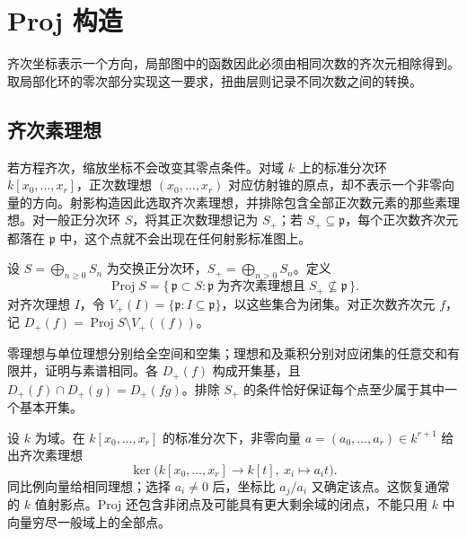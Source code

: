 
\section{Proj 构造}
\label{b3:sec:2403}

齐次坐标表示一个方向，局部图中的函数因此必须由相同次数的齐次元相除得到。取局部化环的零次部分实现这一要求，扭曲层则记录不同次数之间的转换。


%
%
%

\subsection{齐次素理想}
\label{b3:subsec:2403:01}

若方程齐次，缩放坐标不会改变其零点条件。对域 \(k\) 上的标准分次环 \(k[x_0,\ldots,x_r]\)，正次数理想 \((x_0,\ldots,x_r)\) 对应仿射锥的原点，却不表示一个非零向量的方向。射影构造因此选取齐次素理想，并排除包含全部正次数元素的那些素理想。对一般正分次环 \(S\)，将其正次数理想记为 \(S_+\)；若 \(S_+\subseteq\mathfrak p\)，每个正次数齐次元都落在 \(\mathfrak p\) 中，这个点就不会出现在任何射影标准图上。

\begin{definition}\label{b3:def:proj}
	设 \(S=\bigoplus_{n\ge0}S_n\) 为交换正分次环，\(S_+=\bigoplus_{n>0}S_n\)。定义
	\[
		\operatorname{Proj}S =\{\,\mathfrak p\subset S:\mathfrak p\;\text{为齐次素理想且}\; S_+\not\subseteq\mathfrak p\,\}.
	\]
	对齐次理想 \(I\)，令 \(V_+(I)=\{\mathfrak p:I\subseteq\mathfrak p\}\)，以这些集合为闭集。对正次数齐次元 \(f\)，记 \(D_+(f)=\operatorname{Proj}S\setminus V_+((f))\)。
\end{definition}

零理想与单位理想分别给全空间和空集；理想和及乘积分别对应闭集的任意交和有限并，证明与素谱相同。各 \(D_+(f)\) 构成开集基，且 \(D_+(f)\cap D_+(g)=D_+(fg)\)。排除 \(S_+\) 的条件恰好保证每个点至少属于其中一个基本开集。

\ProseParagraphBreak
设 \(k\) 为域。在 \(k[x_0,\ldots,x_r]\) 的标准分次下，非零向量 \(a=(a_0,\ldots,a_r)\in k^{r+1}\) 给出齐次素理想
\[
	\ker\bigl(k[x_0,\ldots,x_r]\longrightarrow k[t],\
	x_i\longmapsto a_it\bigr).
\]
同比例向量给相同理想；选择 \(a_i\ne0\) 后，坐标比 \(a_j/a_i\) 又确定该点。这恢复通常的 \(k\) 值射影点。Proj 还包含非闭点及可能具有更大剩余域的闭点，不能只用 \(k\) 中向量穷尽一般域上的全部点。

